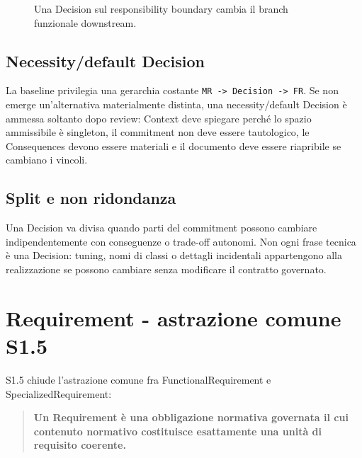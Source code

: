 \documentclass[12pt,a4paper,oneside]{report}
\begin{document}
\begin{figure}[H]
\centering
{}
\caption{Una Decision sul responsibility boundary cambia il branch funzionale downstream.}
\end{figure}

\subsection{Necessity/default Decision}

La baseline privilegia una gerarchia costante \texttt{MR -> Decision -> FR}. Se non emerge un'alternativa materialmente distinta, una necessity/default Decision è ammessa soltanto dopo review: Context deve spiegare perché lo spazio ammissibile è singleton, il commitment non deve essere tautologico, le Consequences devono essere materiali e il documento deve essere riapribile se cambiano i vincoli.

\subsection{Split e non ridondanza}

Una Decision va divisa quando parti del commitment possono cambiare indipendentemente con conseguenze o trade-off autonomi. Non ogni frase tecnica è una Decision: tuning, nomi di classi o dettagli incidentali appartengono alla realizzazione se possono cambiare senza modificare il contratto governato.

\section{Requirement - astrazione comune S1.5}

S1.5 chiude l'astrazione comune fra FunctionalRequirement e SpecializedRequirement:

\begin{quote}
\textbf{Un Requirement è una obbligazione normativa governata il cui contenuto normativo costituisce esattamente una unità di requisito coerente.}
\end{quote}
\end{document}
